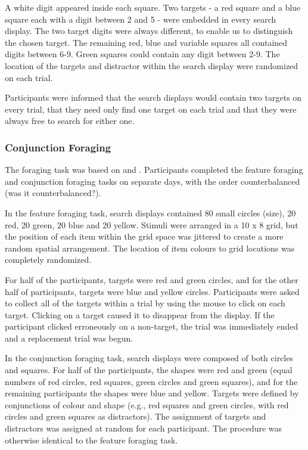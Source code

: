 \documentclass[]{rsos}%
\begin{document}
A white digit appeared inside each square. Two targets - a red square and a blue square each with a digit between 2 and 5 - were embedded in every search display. The two target digits were always different, to enable us to distinguish the chosen target. The remaining red, blue and variable squares all contained digits between 6-9. Green squares could contain any digit between 2-9. The location of the targets and distractor within the search display were randomized on each trial.

Participants were informed that the search displays would contain two targets on every trial, that they need only find one target on each trial and that they were always free to search for either one.   

\subsubsection{Conjunction Foraging}

The foraging task was based on \cite{kristjansson2014} and \cite{johannesson2016}. Participants completed the feature foraging and conjunction foraging tasks on separate days, with the order counterbalanced (was it counterbalanced?).

In the feature foraging task, search displays contained 80 small circles (size), 20 red, 20 green, 20 blue  and 20 yellow. Stimuli were arranged in a 10 x 8 grid, but the position of each item within the grid space was jittered to create a more random spatial arrangement. The location of item colours to grid locations was completely randomized. 

For half of the participants, targets were red and green circles, and for the other half of participants, targets were blue and yellow circles. Participants were asked to collect all of the targets within a trial by using the mouse to click on each target. Clicking on a target caused it to disappear from the display. If the participant clicked erroneously on a non-target, the trial was immediately ended and a replacement trial was begun. 

In the conjunction foraging task, search displays were composed of both circles and squares. For half of the participants, the shapes were red and green (equal numbers of red circles, red squares, green circles and green squares), and for the remaining participants the shapes were blue and yellow. Targets were defined by conjunctions of colour and shape (e.g., red squares and green circles, with red circles and green squares as distractors). The assignment of targets and distractors was assigned at random for each participant. The procedure was otherwise identical to the feature foraging task. 
\end{document}
